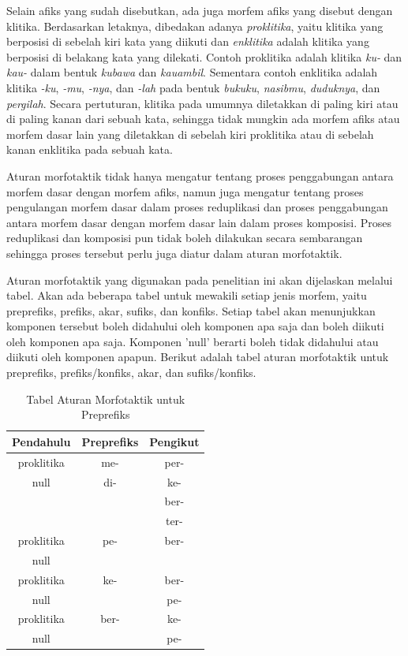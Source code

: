 Selain afiks yang sudah disebutkan, ada juga morfem afiks yang disebut dengan klitika. Berdasarkan letaknya, dibedakan adanya \textit{proklitika}, yaitu klitika yang berposisi di sebelah kiri kata yang diikuti dan \textit{enklitika} adalah klitika yang berposisi di belakang kata yang dilekati. Contoh proklitika adalah klitika \textit{ku-} dan \textit{kau-} dalam bentuk \textit{kubawa} dan \textit{kauambil}. Sementara contoh enklitika adalah klitika \textit{-ku}, \textit{-mu}, \textit{-nya}, dan \textit{-lah} pada bentuk \textit{bukuku}, \textit{nasibmu}, \textit{duduknya}, dan \textit{pergilah}. Secara pertuturan, klitika pada umumnya diletakkan di paling kiri atau di paling kanan dari sebuah kata, sehingga tidak mungkin ada morfem afiks atau morfem dasar lain yang diletakkan di sebelah kiri proklitika atau di sebelah kanan enklitika pada sebuah kata.

Aturan morfotaktik tidak hanya mengatur tentang proses penggabungan antara morfem dasar dengan morfem afiks, namun juga mengatur tentang proses pengulangan morfem dasar dalam proses reduplikasi dan proses penggabungan antara morfem dasar dengan morfem dasar lain dalam proses komposisi. Proses reduplikasi dan komposisi pun tidak boleh dilakukan secara sembarangan sehingga proses tersebut perlu juga diatur dalam aturan morfotaktik.

Aturan morfotaktik yang digunakan pada penelitian ini akan dijelaskan melalui tabel. Akan ada beberapa tabel untuk mewakili setiap jenis morfem, yaitu preprefiks, prefiks, akar, sufiks, dan konfiks. Setiap tabel akan menunjukkan komponen tersebut boleh didahului oleh komponen apa saja dan boleh diikuti oleh komponen apa saja. Komponen 'null' berarti boleh tidak didahului atau diikuti oleh komponen apapun. Berikut adalah tabel aturan morfotaktik untuk preprefiks, prefiks/konfiks, akar, dan sufiks/konfiks.

\begin{table}[H]
\centering
\begin{tabular}{|c|c|c|}
\hline
\textbf{Pendahulu} & \textbf{Preprefiks} & \textbf{Pengikut} \\
\hline
 proklitika&me-&per-\\
 null&di-&ke-\\
 & &ber-\\
 & &ter-\\
 \hline
 proklitika&pe-&ber-\\
 null& & \\
 \hline
 proklitika&ke-&ber-\\
 null& &pe-\\
 \hline
 proklitika&ber-&ke-\\
 null& &pe-\\
\hline
\end{tabular}
\caption{Tabel Aturan Morfotaktik untuk Preprefiks} 
\label{tabel-morfotaktik-preprefiks}
\end{table}

